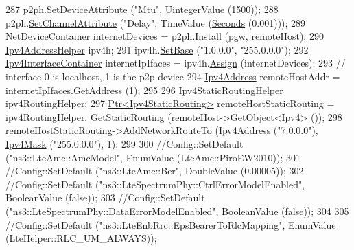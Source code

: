 \begin{DoxyCode}
287   p2ph.\hyperlink{classns3_1_1PointToPointHelper_a4577f5ab8c387e5528af2e0fbab1152e}{SetDeviceAttribute} (\textcolor{stringliteral}{"Mtu"}, UintegerValue (1500));
288   p2ph.\hyperlink{classns3_1_1PointToPointHelper_a6b5317fd17fb61e5a53f8d66a90b63b9}{SetChannelAttribute} (\textcolor{stringliteral}{"Delay"}, TimeValue (\hyperlink{group__timecivil_ga33c34b816f8ff6628e33d5c8e9713b9e}{Seconds} (0.001)));
289   \hyperlink{classns3_1_1NetDeviceContainer}{NetDeviceContainer} internetDevices = p2ph.\hyperlink{classns3_1_1PointToPointHelper_ab9162fea3e88722666fed1106df1f9ec}{Install} (pgw, remoteHost);
290   \hyperlink{classns3_1_1Ipv4AddressHelper}{Ipv4AddressHelper} ipv4h;
291   ipv4h.\hyperlink{classns3_1_1Ipv4AddressHelper_acf7b16dd25bac67e00f5e25f90a9a035}{SetBase} (\textcolor{stringliteral}{"1.0.0.0"}, \textcolor{stringliteral}{"255.0.0.0"});
292   \hyperlink{classns3_1_1Ipv4InterfaceContainer}{Ipv4InterfaceContainer} internetIpIfaces = ipv4h.\hyperlink{classns3_1_1Ipv4AddressHelper_af8e7f4a1a7e74c00014a1eac445a27af}{Assign} (internetDevices);
293   \textcolor{comment}{// interface 0 is localhost, 1 is the p2p device}
294   \hyperlink{classns3_1_1Ipv4Address}{Ipv4Address} remoteHostAddr = internetIpIfaces.\hyperlink{classns3_1_1Ipv4InterfaceContainer_ae63208dcd222be986822937ee4aa828c}{GetAddress} (1);
295 
296   \hyperlink{classns3_1_1Ipv4StaticRoutingHelper}{Ipv4StaticRoutingHelper} ipv4RoutingHelper;
297   \hyperlink{classns3_1_1Ptr}{Ptr<Ipv4StaticRouting>} remoteHostStaticRouting = ipv4RoutingHelper.
      \hyperlink{classns3_1_1Ipv4StaticRoutingHelper_a731206e50d305695dac7fb2ef963a4bb}{GetStaticRouting} (remoteHost->\hyperlink{classns3_1_1Object_a13e18c00017096c8381eb651d5bd0783}{GetObject}<\hyperlink{classns3_1_1Ipv4}{Ipv4}> ());
298   remoteHostStaticRouting->\hyperlink{classns3_1_1Ipv4StaticRouting_a8bf5eaa7ba49fe33c78c70d5560b6c39}{AddNetworkRouteTo} (\hyperlink{classns3_1_1Ipv4Address}{Ipv4Address} (\textcolor{stringliteral}{"7.0.0.0"}), 
      \hyperlink{classns3_1_1Ipv4Mask}{Ipv4Mask} (\textcolor{stringliteral}{"255.0.0.0"}), 1);
299 
300   \textcolor{comment}{//Config::SetDefault ("ns3::LteAmc::AmcModel", EnumValue (LteAmc::PiroEW2010));}
301   \textcolor{comment}{//Config::SetDefault ("ns3::LteAmc::Ber", DoubleValue (0.00005));}
302   \textcolor{comment}{//Config::SetDefault ("ns3::LteSpectrumPhy::CtrlErrorModelEnabled", BooleanValue (false));}
303   \textcolor{comment}{//Config::SetDefault ("ns3::LteSpectrumPhy::DataErrorModelEnabled", BooleanValue (false));}
304 
305   \textcolor{comment}{//Config::SetDefault ("ns3::LteEnbRrc::EpsBearerToRlcMapping", EnumValue (LteHelper::RLC\_UM\_ALWAYS));}

\end{DoxyCode}
